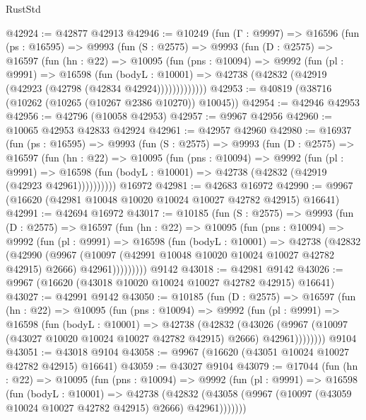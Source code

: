 \begin{lexlean}{RustStd}
\begin{coremodule}
@42924 := @42877 @42913
@42946 := @10249
    (fun (Γ : @9997) =>
    @16596
      (fun (ps : @16595) =>
      @9993
        (fun (S : @2575) =>
        @9993
          (fun (D : @2575) =>
          @16597
            (fun (hn : @22) =>
            @10095
              (fun (pns : @10094) =>
              @9992
                (fun (pl : @9991) =>
                @16598
                  (fun (bodyL : @10001) =>
                  @42738 (@42832 (@42919 (@42923 (@42798 (@42834 @42924)))))))))))))
@42953 := @40819 (@38716 (@10262 (@10265 (@10267 @2386 @10270)) @10045))
@42954 := @42946 @42953
@42956 := @42796 (@10058 @42953)
@42957 := @9967 @42956
@42960 := @10065 @42953 @42833 @42924
@42961 := @42957 @42960
@42980 := @16937
    (fun (ps : @16595) =>
    @9993
      (fun (S : @2575) =>
      @9993
        (fun (D : @2575) =>
        @16597
          (fun (hn : @22) =>
          @10095
            (fun (pns : @10094) =>
            @9992
              (fun (pl : @9991) =>
              @16598 (fun (bodyL : @10001) => @42738 (@42832 (@42919 (@42923 @42961))))))))))
    @16972
@42981 := @42683 @16972
@42990 := @9967 (@16620 (@42981 @10048 @10020 @10024 @10027 @42782 @42915) @16641)
@42991 := @42694 @16972
@43017 := @10185
    (fun (S : @2575) =>
    @9993
      (fun (D : @2575) =>
      @16597
        (fun (hn : @22) =>
        @10095
          (fun (pns : @10094) =>
          @9992
            (fun (pl : @9991) =>
            @16598
              (fun (bodyL : @10001) =>
              @42738
                (@42832
                  (@42990
                    (@9967
                      (@10097 (@42991 @10048 @10020 @10024 @10027 @42782 @42915) @2666)
                      @42961)))))))))
    @9142
@43018 := @42981 @9142
@43026 := @9967 (@16620 (@43018 @10020 @10024 @10027 @42782 @42915) @16641)
@43027 := @42991 @9142
@43050 := @10185
    (fun (D : @2575) =>
    @16597
      (fun (hn : @22) =>
      @10095
        (fun (pns : @10094) =>
        @9992
          (fun (pl : @9991) =>
          @16598
            (fun (bodyL : @10001) =>
            @42738
              (@42832
                (@43026
                  (@9967 (@10097 (@43027 @10020 @10024 @10027 @42782 @42915) @2666) @42961))))))))
    @9104
@43051 := @43018 @9104
@43058 := @9967 (@16620 (@43051 @10024 @10027 @42782 @42915) @16641)
@43059 := @43027 @9104
@43079 := @17044
    (fun (hn : @22) =>
    @10095
      (fun (pns : @10094) =>
      @9992
        (fun (pl : @9991) =>
        @16598
          (fun (bodyL : @10001) =>
          @42738
            (@42832 (@43058 (@9967 (@10097 (@43059 @10024 @10027 @42782 @42915) @2666) @42961)))))))

\end{coremodule}
\end{lexlean}
